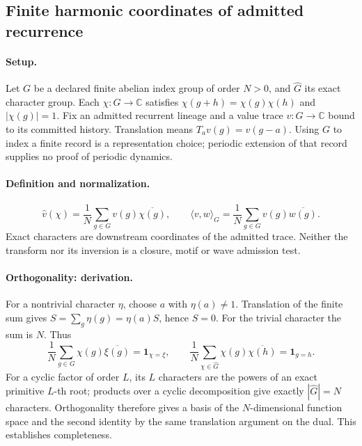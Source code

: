 \subsection{Finite harmonic coordinates of admitted recurrence}
\label{sec:finite-harmonics}
\paragraph{Setup.}
Let \(G\) be a declared finite abelian index group of order \(N>0\), and
\(\widehat G\) its exact character group. Each \(\chi:G\to\mathbb C\)
satisfies \(\chi(g+h)=\chi(g)\chi(h)\) and \(|\chi(g)|=1\).
Fix an admitted recurrent lineage and a value trace \(v:G\to\mathbb C\)
bound to its committed history. Translation means \(T_a v(g)=v(g-a)\).
Using \(G\) to index a finite record is a representation choice; periodic
extension of that record supplies no proof of periodic dynamics.

\paragraph{Definition and normalization.}
\begin{equation}
\widehat v(\chi)=\frac1N\sum_{g\in G}v(g)\overline{\chi(g)},
\qquad \langle v,w\rangle_G=\frac1N\sum_{g\in G}v(g)\overline{w(g)}.
\label{eq:fourier-transform}
\end{equation}
Exact characters are downstream coordinates of the admitted trace. Neither
the transform nor its inversion is a closure, motif or wave admission test.

\paragraph{Orthogonality: derivation.}
For a nontrivial character \(\eta\), choose \(a\) with \(\eta(a)\ne1\).
Translation of the finite sum gives \(S=\sum_g\eta(g)=\eta(a)S\), hence
\(S=0\). For the trivial character the sum is \(N\). Thus
\begin{equation}
\frac1N\sum_{g\in G}\chi(g)\overline{\xi(g)}
=\mathbf1_{\chi=\xi},\qquad
\frac1N\sum_{\chi\in\widehat G}\chi(g)\overline{\chi(h)}
=\mathbf1_{g=h}.
\label{eq:fourier-orthogonality}
\end{equation}
For a cyclic factor of order \(L\), its \(L\) characters are the powers of
an exact primitive \(L\)-th root; products over a cyclic decomposition give
exactly \(|\widehat G|=N\) characters. Orthogonality therefore gives a basis
of the \(N\)-dimensional function space and the second identity by the same
translation argument on the dual. This establishes completeness.

